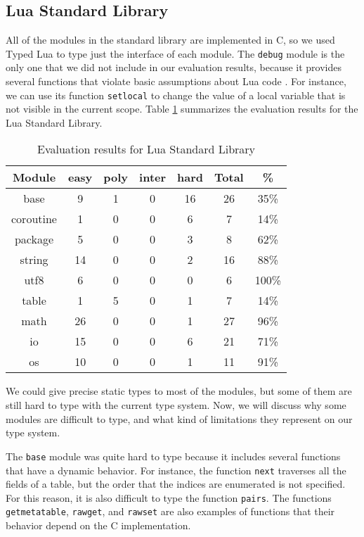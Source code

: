 \subsection{Lua Standard Library}

All of the modules in the standard library are implemented in C, so
we used Typed Lua to type just the interface of each module.
The \texttt{debug} module is the only one that we did not include in our
evaluation results, because it provides several functions that violate
basic assumptions about Lua code \citep{luamanual}.
For instance, we can use its function \texttt{setlocal} to change the value
of a local variable that is not visible in the current scope.
Table \ref{tab:evallsl} summarizes the evaluation results for the Lua Standard Library.

\begin{table}[!ht]
\begin{center}
\begin{tabular}{|c|c|c|c|c|c|c|}
\hline
\textbf{Module} & \textbf{easy} & \textbf{poly} & \textbf{inter} & \textbf{hard} & \textbf{Total} & \textbf{\%} \\
\hline
base & 9 & 1 & 0 & 16 & 26 & 35\% \\
\hline
coroutine & 1 & 0 & 0 & 6 & 7 & 14\% \\
\hline
package & 5 & 0 & 0 & 3 & 8 & 62\% \\
\hline
string & 14 & 0 & 0 & 2 & 16 & 88\% \\
\hline
utf8 & 6 & 0 & 0 & 0 & 6 & 100\% \\
\hline
table & 1 & 5 & 0 & 1 & 7 & 14\% \\
\hline
math & 26 & 0 & 0 & 1 & 27 & 96\% \\
\hline
io & 15 & 0 & 0 & 6 & 21 & 71\% \\
\hline
os & 10 & 0 & 0 & 1 & 11 & 91\% \\
\hline
\end{tabular}
\end{center}
\caption{Evaluation results for Lua Standard Library}
\label{tab:evallsl}
\end{table}

We could give precise static types to most of the modules,
but some of them are still hard to type with the current type
system.
Now, we will discuss why some modules are difficult to type,
and what kind of limitations they represent on our type system.

The \texttt{base} module was quite hard to type because it
includes several functions that have a dynamic behavior.
For instance, the function \texttt{next} traverses all the
fields of a table, but the order that the indices are
enumerated is not specified.
For this reason, it is also difficult to type the function
\texttt{pairs}.
The functions \texttt{getmetatable}, \texttt{rawget}, and
\texttt{rawset} are also examples of functions that their
behavior depend on the C implementation.


